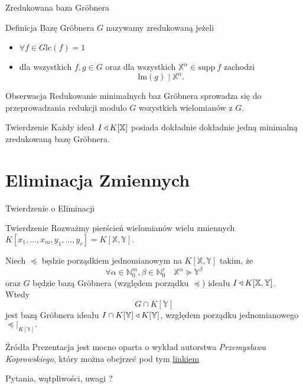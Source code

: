\documentclass{beamer}
\newcommand{\II}{\mathnormal{I}}
\newcommand{\supp}{\textrm{supp}}
\newcommand{\lc}{\textrm{lc}}
\newcommand{\lm}{\textrm{lm}}
\begin{document}
\begin{frame}{Zredukowana baza Gr\"obnera}
    \begin{block}{Definicja}
    Bazę Gr\"obnera $G$ nazywamy zredukowaną jeżeli 
    \begin{itemize}
        \item $\forall f \in G  \lc(f) = 1$
        \item dla wszystkich $f,g \in G$ oraz dla wszystkich $\mathbb{X}^{\alpha} \in \supp \ f$ zachodzi 
        $$ \lm(g) \mid \mathbb{X}^{\alpha}.$$
    \end{itemize}
    \end{block}
    \pause 
    \begin{alertblock}{Obserwacja}
        Redukowanie minimalnych baz Gr\"obnera sprowadza się do przeprowadzania redukcji modulo $G$ wszystkich wielomianów z $G$. 
    \end{alertblock}
    \pause 
    \begin{block}{Twierdzenie}
        Każdy ideał $\II \triangleleft K[\mathbb{X}]$ posiada dokładnie \alert{dokładnie jedną} minimalną zredukowaną bazę Gr\"obnera.
    \end{block}
\end{frame}

\section{Eliminacja Zmiennych}
\begin{frame}{Twierdzenie o Eliminacji}
    \begin{block}{Twierdzenie}
        Rozważmy pierścień wielomianów wielu zmiennych $K[x_1, \ldots, x_m, y_1, \ldots, y_r] = K[\mathbb{X}, \mathbb{Y}].$

        Niech $\preceq$ będzie porządkiem jednomianowym na $K[\mathbb{X},\mathbb{Y}]$ takim, że
        $$ \forall \alpha \in \mathbb{N}_{0}^{m}, \beta \in \mathbb{N}_{0}^{r} \quad \mathbb{X}^{\alpha} \succeq \mathbb{Y}^{\beta} $$
        oraz $G$ będzie bazą Gr\"obnera (względem porządku $\preceq$) ideału $\II \triangleleft K[\mathbb{X}, \mathbb{Y}]$. 
        Wtedy 
        $$ G \cap K[\mathbb{Y}]$$
        jest bazą Gr\"obnera ideału $\II \cap K[\mathbb{Y}] \triangleleft K[\mathbb{Y}]$, względem porządku jednomianowego $\left.\preceq \right|_{K[\mathbb{Y}]}.$
    \end{block}    
\end{frame}

\begin{frame}{Źródła}
    Prezentacja jest mocno oparta o wykład autorstwa \textit{Przemysława Koprowskiego}, który można obejrzeć pod tym 
    \href{https://www.youtube.com/watch?v=vdmyrbNqRlY&t=6452s}{linkiem}
    \printbibliography
\end{frame}

\begin{frame}
    \centering 
    \LARGE Pytania, wątpliwości, uwagi ? 
\end{frame}
\end{document}
